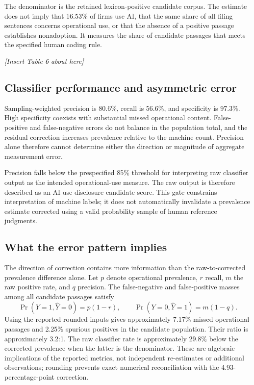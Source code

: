 \documentclass[12pt]{article}
\newcommand{\placement}[1]{%
  \begin{center}
    \vspace{0.5\baselineskip}
    \textit{[Insert #1 about here]}
    \vspace{0.5\baselineskip}
  \end{center}
}
\begin{document}
The denominator is the retained lexicon-positive candidate corpus. The
estimate does not imply that 16.53\% of firms use AI, that the same share of
all filing sentences concerns operational use, or that the absence of a
positive passage establishes nonadoption. It measures the share of candidate
passages that meets the specified human coding rule.

\placement{Table 6}

\subsection{Classifier performance and asymmetric error}

Sampling-weighted precision is 80.6\%, recall is 56.6\%, and specificity is
97.3\%. High specificity coexists with substantial missed operational
content. False-positive and false-negative errors do not balance in the
population total, and the residual correction increases prevalence relative
to the machine count. Precision alone therefore cannot determine either the
direction or magnitude of aggregate measurement error.

Precision falls below the prespecified 85\% threshold for interpreting raw
classifier output as the intended operational-use measure. The raw output is
therefore described as an AI-use disclosure candidate score. This gate
constrains interpretation of machine labels; it does not automatically
invalidate a prevalence estimate corrected using a valid probability sample
of human reference judgments.

\subsection{What the error pattern implies}

The direction of correction contains more information than the raw-to-corrected
prevalence difference alone. Let $p$ denote operational prevalence, $r$ recall,
$m$ the raw positive rate, and $q$ precision. The false-negative and
false-positive masses among all candidate passages satisfy
\[
 \Pr(Y=1,\widehat Y=0)=p(1-r),\qquad
 \Pr(Y=0,\widehat Y=1)=m(1-q).
\]
Using the reported rounded inputs gives approximately 7.17\% missed
operational passages and 2.25\% spurious positives in the candidate population.
Their ratio is approximately 3.2:1. The raw classifier rate is approximately
29.8\% below the corrected prevalence when the latter is the denominator.
These are algebraic implications of the reported metrics, not independent
re-estimates or additional observations; rounding prevents exact numerical
reconciliation with the 4.93-percentage-point correction.
\end{document}
